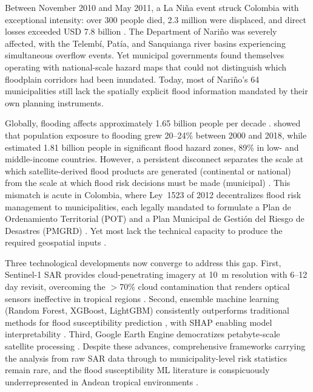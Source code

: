 \documentclass{article}
\begin{document}
Between November 2010 and May 2011, a La Ni\~na event struck Colombia with exceptional intensity: over 300 people died, 2.3 million were displaced, and direct losses exceeded USD 7.8 billion \citep{Hoyos2013}. The Department of Nari\~no was severely affected, with the Telemb\'i, Pat\'ia, and Sanquianga river basins experiencing simultaneous overflow events. Yet municipal governments found themselves operating with national-scale hazard maps that could not distinguish which floodplain corridors had been inundated. Today, most of Nari\~no's 64 municipalities still lack the spatially explicit flood information mandated by their own planning instruments.

Globally, flooding affects approximately 1.65 billion people per decade \citep{UNDRR2020}. \citet{Tellman2021} showed that population exposure to flooding grew 20--24\% between 2000 and 2018, while \citet{Rentschler2022} estimated 1.81 billion people in significant flood hazard zones, 89\% in low- and middle-income countries. However, a persistent disconnect separates the scale at which satellite-derived flood products are generated (continental or national) from the scale at which flood risk decisions must be made (municipal) \citep{Bates2023}. This mismatch is acute in Colombia, where Ley~1523 of 2012 decentralizes flood risk management to municipalities, each legally mandated to formulate a Plan de Ordenamiento Territorial (POT) and a Plan Municipal de Gesti\'on del Riesgo de Desastres (PMGRD) \citep{CongresoCol2012}. Yet most lack the technical capacity to produce the required geospatial inputs \citep{OECD2019}.

Three technological developments now converge to address this gap. First, Sentinel-1 SAR provides cloud-penetrating imagery at \SI{10}{\metre} resolution with 6--12 day revisit, overcoming the $>$70\% cloud contamination that renders optical sensors ineffective in tropical regions \citep{Twele2016, DeVries2020}. Second, ensemble machine learning (Random Forest, XGBoost, LightGBM) consistently outperforms traditional methods for flood susceptibility prediction \citep{Mosavi2018, Darabi2021}, with SHAP enabling model interpretability \citep{Lundberg2017}. Third, Google Earth Engine democratizes petabyte-scale satellite processing \citep{Gorelick2017}. Despite these advances, comprehensive frameworks carrying the analysis from raw SAR data through to municipality-level risk statistics remain rare, and the flood susceptibility ML literature is conspicuously underrepresented in Andean tropical environments \citep{FloodRiskLAC2022}.
\end{document}
